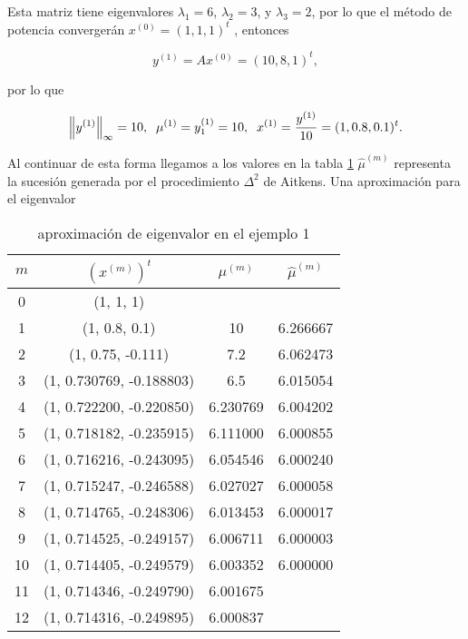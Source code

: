 \documentclass{report}
\numberwithin{subsection}{section} %
\begin{document}
    Esta matriz tiene eigenvalores $\lambda_1 = 6$, $\lambda_2 = 3$, y $\lambda_3 = 2$, por lo que el método de potencia convergerán $x^{(0)} = (1, 1, 1)^t$ , entonces

    $$y^{(1)} = Ax^{(0)} = (10, 8, 1)^t,$$

    por lo que

    $$\left\|y^{(1)}\right\|_{\infty} = 10, \;\; \mu^{(1)} = y_1^{(1)} = 10, \;\; x^{(1)} = {y^{(1)} \over 10} = (1, 0.8, 0.1)^t.$$

    Al continuar de esta forma llegamos a los valores en la tabla \ref{tab:ej1} $\hat{\mu}^{(m)}$ representa la sucesión generada por el procedimiento $\Delta^2$ de Aitkens. Una aproximación para el eigenvalor

    \begin{table}[h!]
        \centering
        \caption{aproximación de eigenvalor en el ejemplo 1}
        \label{tab:ej1}
        \begin{tabular}{|cccc|} \hline
            $m$ & $(x^{(m)})^t$ & $\mu^{(m)}$ & $\hat{\mu}^{(m)}$ \\ \hline
            0  &  (1, 1, 1)  & & \\
            1  &  (1, 0.8, 0.1)  &  10 & 6.266667 \\
            2  &  (1, 0.75, -0.111)  &  7.2 & 6.062473 \\
            3  &  (1, 0.730769, -0.188803)  &  6.5 & 6.015054 \\
            4  &  (1, 0.722200, -0.220850)  &  6.230769 & 6.004202 \\
            5  &  (1, 0.718182, -0.235915)  &  6.111000 & 6.000855  \\
            6  &  (1, 0.716216, -0.243095)  &  6.054546 & 6.000240 \\
            7  &  (1, 0.715247, -0.246588)  &  6.027027 & 6.000058  \\
            8  &  (1, 0.714765, -0.248306)  &  6.013453 & 6.000017  \\
            9  &  (1, 0.714525, -0.249157)  &  6.006711 & 6.000003  \\
            10  &  (1, 0.714405, -0.249579)  &  6.003352 & 6.000000 \\
            11  &  (1, 0.714346, -0.249790)  &  6.001675 & \\
            12  &  (1, 0.714316, -0.249895)  &  6.000837 & \\ \hline
        \end{tabular}
    \end{table}
\end{document}

